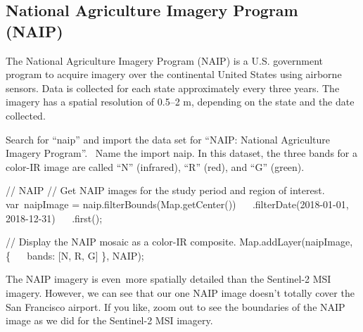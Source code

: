 \documentclass[
  letterpaper,
  DIV=11,
  numbers=noendperiod]{scrreprt}
\newenvironment{Shaded}{\begin{snugshade}}{\end{snugshade}}
\newcommand{\AttributeTok}[1]{\textcolor[rgb]{0.40,0.45,0.13}{#1}}
\newcommand{\BuiltInTok}[1]{\textcolor[rgb]{0.00,0.23,0.31}{#1}}
\newcommand{\CommentTok}[1]{\textcolor[rgb]{0.37,0.37,0.37}{#1}}
\newcommand{\DataTypeTok}[1]{\textcolor[rgb]{0.68,0.00,0.00}{#1}}
\newcommand{\FunctionTok}[1]{\textcolor[rgb]{0.28,0.35,0.67}{#1}}
\newcommand{\NormalTok}[1]{\textcolor[rgb]{0.00,0.23,0.31}{#1}}
\newcommand{\OperatorTok}[1]{\textcolor[rgb]{0.37,0.37,0.37}{#1}}
\newcommand{\StringTok}[1]{\textcolor[rgb]{0.13,0.47,0.30}{#1}}
\begin{document}
\hypertarget{national-agriculture-imagery-program-naip}{%
\subsection{National Agriculture Imagery Program
(NAIP)}\label{national-agriculture-imagery-program-naip}}

The National Agriculture Imagery Program (NAIP) is a U.S. government
program to acquire imagery over the continental United States using
airborne sensors. Data is collected for each state approximately every
three years. The imagery has a spatial resolution of 0.5--2 m, depending
on the state and the date collected. ~

Search for ``naip'' and import the data set for ``NAIP: National
Agriculture Imagery Program''. ~Name the import naip. In this dataset,
the three bands for a color-IR image are called ``N'' (infrared), ``R''
(red), and ``G'' (green).

\begin{Shaded}
\begin{Highlighting}[]
\CommentTok{// NAIP  }
\CommentTok{// Get NAIP images for the study period and region of interest.  }
\NormalTok{var naipImage }\OperatorTok{=}\NormalTok{ naip}\OperatorTok{.}\FunctionTok{filterBounds}\NormalTok{(}\BuiltInTok{Map}\OperatorTok{.}\FunctionTok{getCenter}\NormalTok{())  }
  \AttributeTok{ }\OperatorTok{.}\FunctionTok{filterDate}\NormalTok{(}\StringTok{\textquotesingle{}2018{-}01{-}01\textquotesingle{}}\OperatorTok{,} \StringTok{\textquotesingle{}2018{-}12{-}31\textquotesingle{}}\NormalTok{)  }
  \AttributeTok{ }\OperatorTok{.}\FunctionTok{first}\NormalTok{()}\OperatorTok{;}  
  
\CommentTok{// Display the NAIP mosaic as a color{-}IR composite.  }
\BuiltInTok{Map}\OperatorTok{.}\FunctionTok{addLayer}\NormalTok{(naipImage}\OperatorTok{,}\NormalTok{ \{  }
  \DataTypeTok{ bands}\OperatorTok{:}\NormalTok{ [}\StringTok{\textquotesingle{}N\textquotesingle{}}\OperatorTok{,} \StringTok{\textquotesingle{}R\textquotesingle{}}\OperatorTok{,} \StringTok{\textquotesingle{}G\textquotesingle{}}\NormalTok{]  }
\NormalTok{\}}\OperatorTok{,} \StringTok{\textquotesingle{}NAIP\textquotesingle{}}\NormalTok{)}\OperatorTok{;}
\end{Highlighting}
\end{Shaded}

The NAIP imagery is even~more spatially detailed than the Sentinel-2 MSI
imagery. However, we can see that our one NAIP image doesn't totally
cover the San Francisco airport. If you like, zoom out to see the
boundaries of the NAIP image as we did for the Sentinel-2 MSI imagery.
\end{document}
